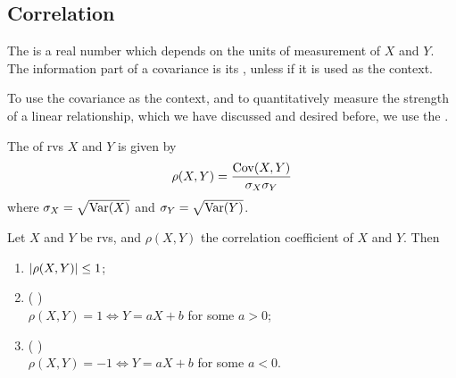 \documentclass[notoc,notitlepage]{tufte-book}
\begin{document}

\subsection{Correlation}%
\label{sub:correlation}

The  is a real number which depends on the units of measurement of $X$ and $Y$. The information part of a covariance is its , unless if it is used as the context.

To use the covariance as the context, and to quantitatively measure the strength of a linear relationship, which we have discussed and desired before, we use the .

\begin{defn}
\label{defn:correlation_coefficient}
  The  of rvs $X$ and $Y$ is given by
  \begin{equation*}
    \rho(X, Y) = \frac{\operatorname{Cov}(X, Y)}{\sigma_X \sigma_Y}
  \end{equation*}
  where $\sigma_X = \sqrt{\operatorname{Var}(X)}$ and $\sigma_Y = \sqrt{\operatorname{Var}(Y)}$.
\end{defn}

\begin{propo}
\label{propo:properties_of_the_correlation_coefficient}
  Let $X$ and $Y$ be rvs, and $\rho(X, Y)$ the correlation coefficient of $X$ and $Y$. Then
  \begin{enumerate}
    \item $\left|\rho(X, Y)\right| \leq 1$;
    \item (   ) \\
      $\rho(X, Y) = 1 \iff Y = aX + b$ for some $a > 0$;
    \item (  ) \\
      $\rho(X, Y) = -1 \iff Y = aX + b$ for some $a < 0$.
  \end{enumerate}
\end{propo}
\end{document}
